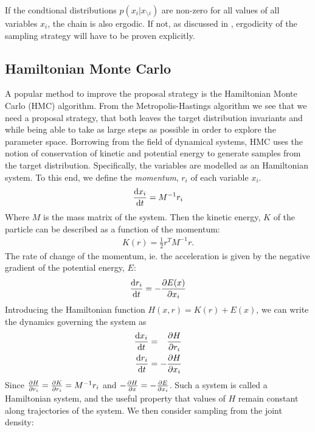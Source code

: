 If the condtional distributions $p(x_i|x_{\setminus i})$ are non-zero for all values of all variables $x_i$, the chain is also ergodic.
If not, as discussed in \cite{bishop_pattern_2006}, ergodicity of the sampling strategy will have to be proven explicitly.

\subsection{Hamiltonian Monte Carlo}

A popular method to improve the proposal strategy is the Hamiltonian Monte Carlo (HMC) algorithm. 
From the Metropolis-Hastings algorithm we see that we need a proposal strategy, that both leaves the target distribution invariants and while being able to take as large steps as possible in order to explore the parameter space.
Borrowing from the field of dynamical systems, HMC uses the notion of conservation of kinetic and potential energy to generate samples from the target distribution. 
Specifically, the variables are modelled as an Hamiltonian system.
To this end, we define the \emph{momentum}, $r_i$ of each variable $x_i$.
\begin{align*}
    \dv{x_i}{t} = M^{-1} r_i
\end{align*}
Where $M$ is the mass matrix of the system.
Then the kinetic energy, $K$ of the particle can be described as a function of the momentum:
\begin{align*}
    K(r) = \frac{1}{2}r^T M^{-1} r.
\end{align*}
The rate of change of the momentum, ie. the acceleration is given by the negative gradient of the potential energy, $E$:
\begin{align*}
    \dv{r_i}{t} = -\pdv{E(x)}{x_i}
\end{align*}
Introducing the Hamiltonian function $H(x, r) = K(r) + E(x)$, we can write the dynamics governing the system as
\begin{equation}\label{eq:hmc-dynamics}
    \begin{aligned}
        \dv{x_i}{t} &= \phantom{-}\pdv{H}{r_i}\\
        \dv{r_i}{t} &= -\pdv{H}{x_i}
    \end{aligned}
\end{equation}
Since $\pdv{H}{r_i} = \pdv{K}{r_i} = M^{-1}r_i$ and $-\pdv{H}{x} = -\pdv{E}{x_i}$. 
Such a system is called a Hamiltonian system, and the useful property that values of $H$ remain constant along trajectories of the system.
We then consider sampling from the joint density:
